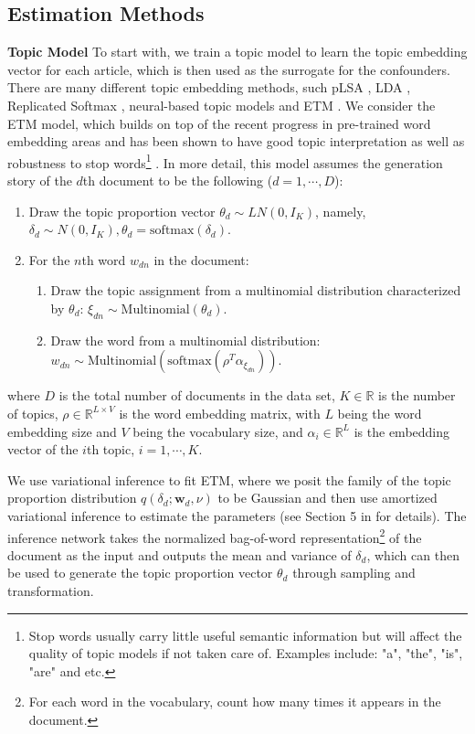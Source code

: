 \documentclass{article}
\begin{document}
	\subsection{Estimation Methods}
	\textbf{Topic Model} To start with, we train a topic model to learn the topic embedding vector for each article, which is then used as the surrogate for the confounders. There are many different topic embedding methods, such pLSA \parencite{hofmann1999probabilistic}, LDA \parencite{blei2003latent}, Replicated Softmax \parencite{hinton2009replicated}, neural-based topic models \parencite{miao2017discovering} and ETM \parencite{dieng2020topic}. We consider the ETM model, which builds on top of the recent progress in pre-trained word embedding areas and has been shown to have good topic interpretation as well as robustness to stop words\footnote{Stop words usually carry little useful semantic information but will affect the quality of topic models if not taken care of. Examples include: "a", "the", "is", "are" and etc.} \parencite{dieng2020topic}. In more detail, this model assumes the generation story of the $d$th document to be the following ($d = 1, \cdots, D$):
	\begin{enumerate}
		\item Draw the topic proportion vector $\theta_d \sim LN(0, I_K)$, namely, $\delta_d \sim N(0, I_K), \theta_d = \text{softmax} (\delta_d)$.
		\item For the $n$th word $w_{dn}$ in the document: 
		\begin{enumerate}
			\item Draw the topic assignment from a multinomial distribution characterized by $\theta_d$: $\xi_{dn} \sim \text{Multinomial}(\theta_d)$.
			\item Draw the word from a multinomial distribution: $w_{dn} \sim \text{Multinomial}(\text{softmax} (\rho^T \alpha_{\xi_{dn}}))$.
		\end{enumerate}
	\end{enumerate}
	where $D$ is the total number of documents in the data set, $K \in \mathbb{R}$ is the number of topics, $\rho \in \mathbb{R}^{L\times V}$ is the word embedding matrix, with $L$ being the word embedding size and $V$ being the vocabulary size, and $\alpha_i \in \mathbb{R}^L$ is the  embedding vector of the $i$th topic, $i = 1, \cdots, K$.
	
	We use variational inference \parencite{jordan1999introduction, wainwright2008graphical} to fit ETM, where we posit the family of the topic proportion distribution $q(\delta_d; \textbf{w}_d, \nu)$ to be Gaussian and then use amortized variational inference \parencite{kingma2013auto, rezende2014stochastic} to estimate the parameters (see Section 5 in \cite{dieng2020topic} for details). The inference network takes the normalized bag-of-word representation\footnote{For each word in the vocabulary, count how many times it appears in the document.} of the document as the input and outputs the mean and variance of $\delta_d$, which can then be used to generate the topic proportion vector $\theta_d$ through sampling and transformation.
	
\end{document}
